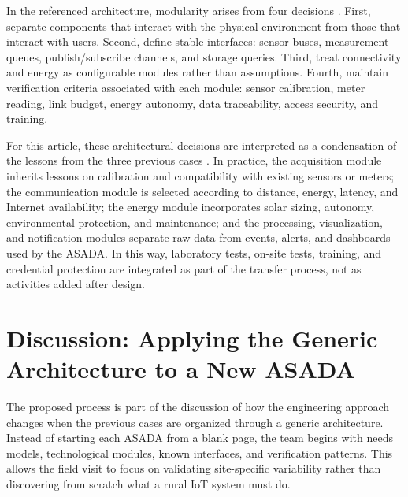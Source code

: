 \documentclass[conference]{IEEEtran}
\begin{document}
In the referenced architecture, modularity arises from four decisions \cite{Arguedas2025ModularArchitecture}. First, separate components that interact with the physical environment from those that interact with users. Second, define stable interfaces: sensor buses, measurement queues, publish/subscribe channels, and storage queries. Third, treat connectivity and energy as configurable modules rather than assumptions. Fourth, maintain verification criteria associated with each module: sensor calibration, meter reading, link budget, energy autonomy, data traceability, access security, and training.

For this article, these architectural decisions are interpreted as a condensation of the lessons from the three previous cases \cite{Chavarria2021,Solorzano2021,Oviedo2024}. In practice, the acquisition module inherits lessons on calibration and compatibility with existing sensors or meters; the communication module is selected according to distance, energy, latency, and Internet availability; the energy module incorporates solar sizing, autonomy, environmental protection, and maintenance; and the processing, visualization, and notification modules separate raw data from events, alerts, and dashboards used by the ASADA. In this way, laboratory tests, on-site tests, training, and credential protection are integrated as part of the transfer process, not as activities added after design.

\section{Discussion: Applying the Generic Architecture to a New ASADA}
The proposed process is part of the discussion of how the engineering approach changes when the previous cases are organized through a generic architecture. Instead of starting each ASADA from a blank page, the team begins with needs models, technological modules, known interfaces, and verification patterns. This allows the field visit to focus on validating site-specific variability rather than discovering from scratch what a rural IoT system must do.
\end{document}
